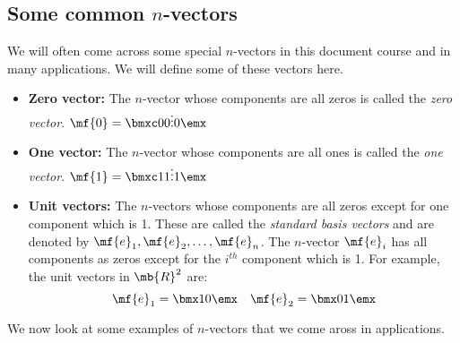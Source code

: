 \subsection{Some common $n$-vectors}
We will often come across some special $n$-vectors in this document course and in many applications. We will define some of these vectors here.
\begin{itemize}
    \item \textbf{Zero vector:} The $n$-vector whose components are all zeros is called the \textit{zero vector}. $\mf{0} = \bmxc 0 \\ 0 \\ \vdots \\ 0\emx$
    \item \textbf{One vector:} The $n$-vector whose components are all ones is called the \textit{one vector}. $\mf{1} = \bmxc 1 \\ 1 \\ \vdots \\ 1\emx$
    \item \textbf{Unit vectors:} The $n$-vectors whose components are all zeros except for one component which is 1. These are called the \textit{standard basis vectors} and are denoted by $\mf{e}_1, \mf{e}_2, \ldots, \mf{e}_n$. The $n$-vector $\mf{e}_i$ has all components as zeros except for the $i^{th}$ component which is 1. For example, the unit vectors in $\mb{R}^2$ are:
    \[ \mf{e}_1 = \bmx 1 \\ 0\emx \quad \mf{e}_2 = \bmx 0 \\ 1 \emx  \]
\end{itemize}

We now look at some examples of $n$-vectors that we come aross in applications.


